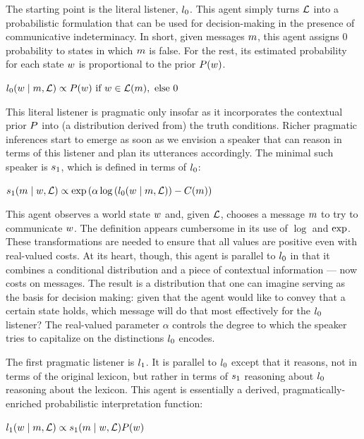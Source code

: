\documentclass[12pt,twoside]{article}
\renewcommand{\_}{\textbf{\textunderscore\hspace{-4pt}\textunderscore\hspace{-3pt}\textunderscore\hspace{-4pt}\textunderscore}\hspace{0.5pt}}			%
\begin{document}
The starting point is the literal listener, $l_{0}$. This
agent simply turns $\mathcal{L}$ into a probabilistic formulation that can be
used for decision-making in the presence of communicative
indeterminacy. In short, given messages $m$, this agent assigns $0$
probability to states in which $m$ is false. For the rest, its
estimated probability for each state $w$ is proportional to the
prior $P(w)$.
%
\begin{exe}
\ex\label{l0} $l_{0}(w \mid m, \mathcal{L}) \propto P(w) \text{ if } w \in \mathcal{L}(m), \text{ else } 0$
\end{exe}

This literal listener is pragmatic only insofar as it incorporates the
contextual prior $P$ into (a distribution derived from) the truth
conditions. Richer pragmatic inferences start to emerge as soon as we
envision a speaker that can reason in terms of this listener and plan
its utterances accordingly. The minimal such speaker is $s_{1}$,
which is defined in terms of $l_{0}$:
%
%
%
%
\begin{exe}
\ex\label{s1} $s_{1}(m \mid w, \mathcal{L}) \propto \operatorname{exp} \left( \alpha\log \left( l_{0}(w \mid m, \mathcal{L}) \right) -  C(m) \right)$
\end{exe}
%
This agent observes a world state $w$ and, given $\mathcal{L}$, chooses
a message $m$ to try to communicate $w$. The definition
appears cumbersome in its use of $\log$ and $\operatorname{exp}$. These
transformations are needed to ensure that all values are positive even
with real-valued costs. At its heart, though, this agent is parallel
to $l_{0}$ in that it combines a conditional distribution and
a piece of contextual information --- now costs on messages. The
result is a distribution that one can imagine serving as the basis for
decision making: given that the agent would like to convey that a
certain state holds, which message will do that most effectively for
the $l_{0}$ listener? The real-valued parameter $\alpha$
controls the degree to which the speaker tries to capitalize on the
distinctions $l_{0}$ encodes.

The first pragmatic listener is $l_{1}$. It is parallel to
$l_{0}$ except that it reasons, not in terms of the original
lexicon, but rather in terms of $s_{1}$ reasoning about
$l_{0}$ reasoning about the lexicon. This agent is essentially
a derived, pragmatically-enriched probabilistic interpretation
function:
%
\begin{exe}
\ex\label{l1} $l_{1}(w \mid m, \mathcal{L}) \propto s_{1}(m \mid w, \mathcal{L}) P(w)$
\end{exe}
\end{document}
